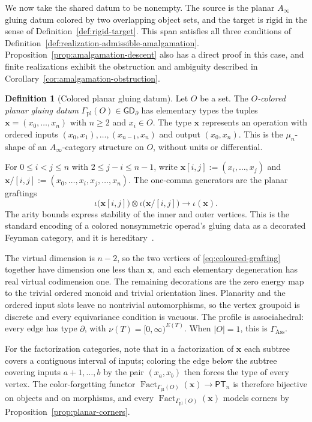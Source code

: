 \documentclass[11pt,letterpaper,twoside]{article}
\theoremstyle{plain}
\theoremstyle{definition}
\newtheorem{definition}[theorem]{Definition}
\theoremstyle{remark}
\let\cite\citep
\newcommand{\Ainf}{A_\infty}
\newcommand{\BGrm}{\mathsf{GD}_{\partial}}
\DeclareMathOperator{\Fact}{Fact}
\begin{document}
We now take the shared datum to be nonempty.  The source is the planar \(\Ainf\) gluing datum colored by two overlapping object sets, and the target is rigid in the sense of Definition~\ref{def:rigid-target}.  This span satisfies all three conditions of Definition~\ref{def:realization-admissible-amalgamation}.  Proposition~\ref{prop:amalgamation-descent} also has a direct proof in this case, and finite realizations exhibit the obstruction and ambiguity described in Corollary~\ref{cor:amalgamation-obstruction}.

\begin{definition}[Colored planar gluing datum]\label{def:coloured-planar-grammar}
Let \(O\) be a set.  The \emph{\(O\)-colored planar gluing datum} \(\Gamma_{\mathrm{pl}}(O)\in\BGrm\) has elementary types the tuples \(\mathbf x=(x_0,\dots,x_n)\) with \(n\ge2\) and \(x_i\in O\).  The type \(\mathbf x\) represents an operation with ordered inputs \((x_0,x_1),\dots,(x_{n-1},x_n)\) and output \((x_0,x_n)\).  This is the \(\mu_n\)-shape of an \(\Ainf\)-category structure on \(O\), without units or differential.

For \(0\le i<j\le n\) with \(2\le j-i\le n-1\), write \(\mathbf x[i,j]:=(x_i,\dots,x_j)\) and \(\mathbf x/[i,j]:=(x_0,\dots,x_i,x_j,\dots,x_n)\).  The one-comma generators are the planar graftings
\begin{equation}\label{eq:coloured-grafting}
 \iota\bigl(\mathbf x[i,j]\bigr)\otimes\iota\bigl(\mathbf x/[i,j]\bigr)\longrightarrow\iota(\mathbf x).
\end{equation}
The arity bounds express stability of the inner and outer vertices.  This is the standard encoding of a colored nonsymmetric operad's gluing data as a decorated Feynman category, and it is hereditary~\cite{kaufmannward2017}.

The virtual dimension is \(n-2\), so the two vertices of \eqref{eq:coloured-grafting} together have dimension one less than \(\mathbf x\), and each elementary degeneration has real virtual codimension one.  The remaining decorations are the zero energy map to the trivial ordered monoid and trivial orientation lines.  Planarity and the ordered input slots leave no nontrivial automorphisms, so the vertex groupoid is discrete and every equivariance condition is vacuous.  The profile is associahedral: every edge has type \(\partial\), with \(\nu(T)=[0,\infty)^{E(T)}\).  When \(|O|=1\), this is \(\Gamma_{\mathrm{Ass}}\).
\end{definition}

For the factorization categories, note that in a factorization of \(\mathbf x\) each subtree covers a contiguous interval of inputs; coloring the edge below the subtree covering inputs \(a+1,\dots,b\) by the pair \((x_a,x_b)\) then forces the type of every vertex.  The color-forgetting functor \(\Fact_{\Gamma_{\mathrm{pl}}(O)}(\mathbf x)\to\mathsf{PT}_n\) is therefore bijective on objects and on morphisms, and every \(\Fact_{\Gamma_{\mathrm{pl}}(O)}(\mathbf x)\) models corners by Proposition~\ref{prop:planar-corners}.
\end{document}

